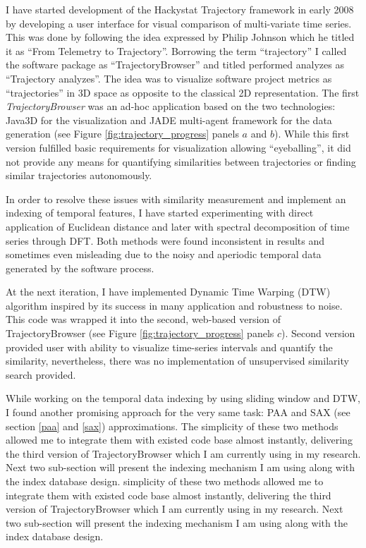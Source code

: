 I have started development of the Hackystat Trajectory framework in early 2008 by developing a user interface for visual comparison of multi-variate time series. This was done by following the idea expressed by Philip Johnson which he titled it as ``From Telemetry to Trajectory''. Borrowing the term ``trajectory'' I called the software package as ``TrajectoryBrowser'' and titled performed analyzes as ``Trajectory analyzes''. The idea was to visualize software project metrics as ``trajectories'' in 3D space as opposite to the classical 2D representation. The first \textit{TrajectoryBrowser} was an ad-hoc application based on the two technologies: Java3D for the visualization and JADE multi-agent framework \cite{citeulike:1230319} for the data generation (see Figure \ref{fig:trajectory_progress} panels $a$ and $b$). While this first version fulfilled basic requirements for visualization allowing ``eyeballing'', it did not provide any means for quantifying similarities between trajectories or finding similar trajectories autonomously.

In order to resolve these issues with similarity measurement and implement an indexing of temporal features, I have started experimenting with direct application of Euclidean distance and later with spectral decomposition of time series through DFT. Both methods were found inconsistent in results and sometimes even misleading due to the noisy and aperiodic temporal data generated by the software process. 

At the next iteration, I have implemented Dynamic Time Warping (DTW) algorithm inspired by its success in many application and robustness to noise. This code was wrapped it into the second, web-based version of TrajectoryBrowser (see Figure \ref{fig:trajectory_progress} panels $c$). Second version provided user with ability to visualize time-series intervals and quantify the similarity, nevertheless, there was no implementation of unsupervised similarity search provided.

While working on the temporal data indexing by using sliding window and DTW, I found another promising approach for the very same task: PAA and SAX (see section \ref{paa} and \ref{sax}) approximations. The simplicity of these two methods allowed me to integrate them with existed code base almost instantly, delivering the third version of TrajectoryBrowser which I am currently using in my research. Next two sub-section will present the indexing mechanism I am using along with the index database design. simplicity of these two methods allowed me to integrate them with existed code base almost instantly, delivering the third version of TrajectoryBrowser which I am currently using in my research. Next two sub-section will present the indexing mechanism I am using along with the index database design.

